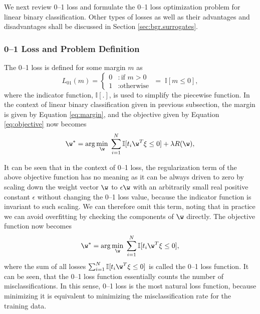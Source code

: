 We next review 0--1 loss and formulate the 0--1 loss optimization problem for linear binary classification. Other types of losses as well as their advantages and disadvantages shall be discussed in Section \ref{sec:bgr.surrogates}.   


\subsubsection{0--1 Loss and Problem Definition}
\label{ssec:01loss}

The 0--1 loss is defined for some margin $m$ as 
$$
L_{01}(m) = \left\{
     \begin{array}{ll}
       0 & : \text{if }m > 0\\
       1 & : \text{otherwise}
     \end{array}
   \right.
   \; = \; \mathbb{I} [m \leq 0],
$$
where the indicator function, $\mathbb{I} [.]$, is used to simplify the piecewise function. In the context of linear binary classification given in previous subsection, the margin is given by Equation \ref{eq:margin}, and the objective given by Equation \ref{eq:objective} now becomes
\begin{equation}
\label{eq:objective01}
 \w^* = \arg\min_{\w} \; \sum_{i=1}^{N} \mathbb{I} [t_i \w^T \xi \leq 0] + \lambda R(\w),
\end{equation}

It can be seen that in the context of 0--1 loss, the regularization term of the above objective function has no meaning as it can be always driven to zero by scaling down the weight vector $\w$ to $\epsilon \w$ with an arbitrarily small real positive constant $\epsilon$ without changing the 0--1 loss value, because the indicator function is invariant to such scaling. We can therefore omit this term, noting that in practice we can avoid overfitting by checking the components of $\w$ directly. The objective function now becomes
\begin{equation}
\label{eq:objective01}
 \w^* = \arg\min_{\w} \; \sum_{i=1}^{N} \mathbb{I} [t_i \w^T \xi \leq 0],
\end{equation}
where the sum of all losses $\sum_{i=1}^{N} \mathbb{I} [t_i \w^T \xi \leq 0]$ is called the 0--1 loss function. It can be seen, that the 0--1 loss function essentially counts the number of misclassifications. In this sense, 0--1 loss is the most natural loss function, because minimizing it is equivalent to minimizing the misclassification rate for the training data.

